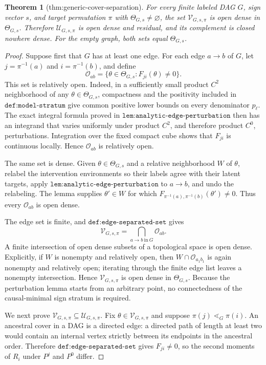 \documentclass{article}
\newtheorem{theorem}{Theorem}
\begin{document}
\begin{theorem}[thm:generic-cover-separation]\label{thm:generic-cover-separation}
For every finite labeled DAG \(G\), sign vector \(s\), and target permutation \(\pi\) with \(\Theta_{G,s}\ne\varnothing\), the set \(\mathcal V_{G,s,\pi}\) is open dense in \(\Theta_{G,s}\). Therefore \(\mathcal U_{G,s,\pi}\) is open dense and residual, and its complement is closed nowhere dense. For the empty graph, both sets equal \(\Theta_{G,s}\).
\end{theorem}
\begin{proof}
Suppose first that \(G\) has at least one edge. For each edge \(a\to b\) of \(G\), let \(j=\pi^{-1}(a)\) and \(i=\pi^{-1}(b)\), and define
\[
 \mathcal O_{ab}
 =\{\theta\in\Theta_{G,s}:F_{ji}(\theta)\ne0\}.
\]
This set is relatively open. Indeed, in a sufficiently small product \(C^2\) neighborhood of any \(\theta\in\Theta_{G,s}\), compactness and the positivity included in \(\texttt{def:model-stratum}\) give common positive lower bounds on every denominator \(p_\ell\). The exact integral formula proved in \(\texttt{lem:analytic-edge-perturbation}\) then has an integrand that varies uniformly under product \(C^2\), and therefore product \(C^0\), perturbations. Integration over the fixed compact cube shows that \(F_{ji}\) is continuous locally. Hence \(\mathcal O_{ab}\) is relatively open.

The same set is dense. Given \(\theta\in\Theta_{G,s}\) and a relative neighborhood \(W\) of \(\theta\), relabel the intervention environments so their labels agree with their latent targets, apply \(\texttt{lem:analytic-edge-perturbation}\) to \(a\to b\), and undo the relabeling. The lemma supplies \(\theta'\in W\) for which \(F_{\pi^{-1}(a),\pi^{-1}(b)}(\theta')\ne0\). Thus every \(\mathcal O_{ab}\) is open dense.

The edge set is finite, and \(\texttt{def:edge-separated-set}\) gives
\[
 \mathcal V_{G,s,\pi}
 =\bigcap_{a\to b\ \mathrm{in}\ G}\mathcal O_{ab}.
\]
A finite intersection of open dense subsets of a topological space is open dense. Explicitly, if \(W\) is nonempty and relatively open, then \(W\cap\mathcal O_{a_1b_1}\) is again nonempty and relatively open; iterating through the finite edge list leaves a nonempty intersection. Hence \(\mathcal V_{G,s,\pi}\) is open dense in \(\Theta_{G,s}\). Because the perturbation lemma starts from an arbitrary point, no connectedness of the causal-minimal sign stratum is required.

We next prove \(\mathcal V_{G,s,\pi}\subseteq\mathcal U_{G,s,\pi}\). Fix \(\theta\in\mathcal V_{G,s,\pi}\) and suppose \(\pi(j)\lessdot_G\pi(i)\). An ancestral cover in a DAG is a directed edge: a directed path of length at least two would contain an internal vertex strictly between its endpoints in the ancestral order. Therefore \(\texttt{def:edge-separated-set}\) gives \(F_{ji}\ne0\), so the second moments of \(R_i\) under \(P^j\) and \(P^0\) differ.


\end{proof}
\end{document}
